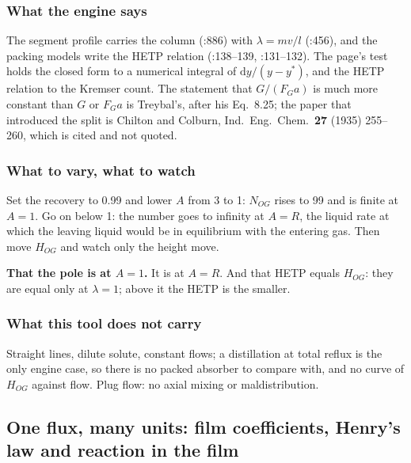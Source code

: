 \documentclass[11pt,a4paper]{article}
\begin{document}
\subsubsection*{What the engine says}

The segment profile carries the  column
(:886) with $\lambda = m v/l$
(:456), and the packing models write the HETP
relation (:138--139, :131--132).
The page's test holds the closed form to a numerical integral of
$\mathrm{d}y/(y-y^*)$, and the HETP relation to the Kremser count.  The
statement that $G/(F_G a)$ is much more constant than $G$ or $F_G a$ is
Treybal's, after his Eq.~8.25; the paper that introduced the split is
Chilton and Colburn, Ind.\ Eng.\ Chem.\ \textbf{27} (1935) 255--260, which is
cited and not quoted.

\subsubsection*{What to vary, what to watch}

\begin{tryit}
Set the recovery to 0.99 and lower $A$ from 3 to 1: $N_{OG}$ rises to 99 and
is finite at $A = 1$.  Go on below 1: the number goes to infinity at $A = R$,
the liquid rate at which the leaving liquid would be in equilibrium with the
entering gas.  Then move $H_{OG}$ and watch only the height move.
\end{tryit}

\begin{pitfall}
\textbf{That the pole is at $A = 1$.}  It is at $A = R$.  And that HETP equals
$H_{OG}$: they are equal only at $\lambda = 1$; above it the HETP is the
smaller.
\end{pitfall}

\subsubsection*{What this tool does not carry}

Straight lines, dilute solute, constant flows; a distillation at total reflux
is the only engine case, so there is no packed absorber to compare with, and no
curve of $H_{OG}$ against flow.  Plug flow: no axial mixing or maldistribution.

\subsection{One flux, many units: film coefficients, Henry's law and reaction in the film}\label{sec:edu-one-flux-many-units}
\end{document}
